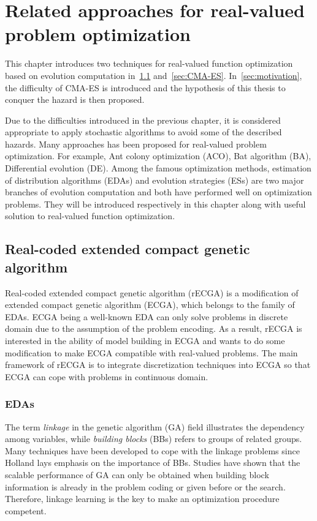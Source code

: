 \chapter{Related approaches for real-valued problem optimization}
\label{ch:Approaches-for-real-valued-problem}

This chapter introduces two techniques for real-valued function optimization
based on evolution computation in~\ref{sec:rECGA} and~\ref{sec:CMA-ES}.
In~\ref{sec:motivation}, the difficulty of CMA-ES is introduced and the
hypothesis of this thesis to conquer the hazard is then proposed.

Due to the difficulties introduced in the previous chapter, it is considered
appropriate to apply stochastic algorithms to avoid some of the described
hazards.  Many approaches has been proposed for real-valued problem
optimization.  For example, Ant colony optimization (ACO), Bat algorithm (BA),
Differential evolution (DE).  Among the famous optimization methods, estimation
of distribution algorithms (EDAs) and evolution strategies (ESs) are two major
branches of evolution computation and both have performed well on optimization
problems.  They will be introduced respectively in this chapter along with
useful solution to real-valued function optimization. 


\section{Real-coded extended compact genetic algorithm}
\label{sec:rECGA}

Real-coded extended compact genetic algorithm (rECGA) is a modification
of extended compact genetic algorithm (ECGA), which belongs to the
family of EDAs.  ECGA being a well-known EDA can only solve problems in
discrete domain due to the assumption of the problem encoding.  As a
result, rECGA is interested in the ability of model building in ECGA and
wants to do some modification to make ECGA compatible with real-valued
problems.  The main framework of rECGA is to integrate discretization
techniques into ECGA so that ECGA can cope with problems in continuous
domain.  \subsection{EDAs}

The term \emph{linkage} in the genetic algorithm (GA) field illustrates
the dependency among variables, while \emph{building blocks} (BBs)
refers to groups of related groups.  Many techniques have been developed
to cope with the linkage problems since Holland lays emphasis on the
importance of BBs.  Studies have shown that the scalable performance of
GA can only be obtained when building block information is already in
the problem coding or given before or the search.  Therefore, linkage
learning is the key to make an optimization procedure competent.

